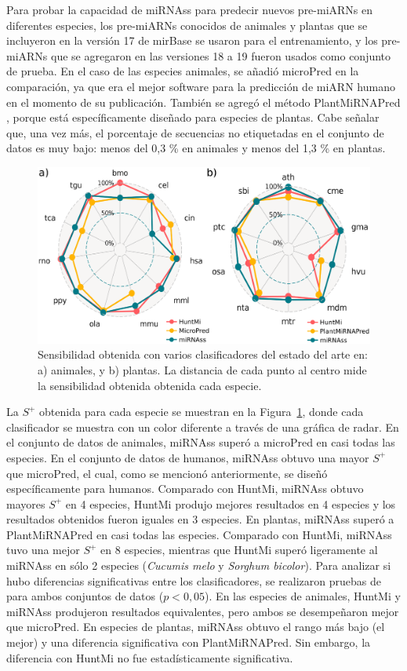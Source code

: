 Para probar la capacidad de miRNAss para predecir nuevos pre-miARNs en diferentes especies, los pre-miARNs conocidos de animales y plantas que se incluyeron en
la versión 17 de mirBase se usaron para el entrenamiento, y los pre-miARNs que se agregaron en las versiones 18 a 19 fueron usados como conjunto de prueba. En
el caso de las especies animales, se añadió microPred \citep{batuwita2009micropred} en la comparación, ya que era el mejor software para la predicción de miARN
humano en el momento de su publicación. También se agregó el método PlantMiRNAPred \citep{xuan2011plantmirnapred}, porque está específicamente diseñado para
especies de plantas. Cabe señalar que, una vez más, el porcentaje de secuencias no etiquetadas en el conjunto de datos es muy bajo: menos del 0,3 \% en animales
y menos del 1,3 \% en plantas.
\begin{figure}[t]
	\centering
	\includegraphics[width=0.6\linewidth]{fig/delta_mirbase_radar.eps}
	\caption[Sensibilidad en animales y plantas]{Sensibilidad obtenida con varios clasificadores del estado del arte en: a) animales, y b) plantas.
		La distancia de cada punto al centro mide la sensibilidad obtenida obtenida cada especie.}
	\label{fig:deltaRadar}
\end{figure}
La $S^{+}$ obtenida para cada especie se muestran en la Figura~\ref{fig:deltaRadar}, donde cada clasificador se muestra con un color diferente a través de una
gráfica de radar. En el conjunto de datos de animales, miRNAss superó a microPred en casi todas las especies. En el conjunto de datos de humanos, miRNAss obtuvo
una mayor $S^{+}$ que microPred, el cual, como se mencionó anteriormente, se diseñó específicamente para humanos. Comparado con HuntMi, miRNAss obtuvo mayores
$S^{+}$ en 4 especies, HuntMi produjo mejores resultados en 4 especies y los resultados obtenidos fueron iguales en 3 especies. En plantas, miRNAss superó a
PlantMiRNAPred en casi todas las especies. Comparado con HuntMi, miRNAss tuvo una mejor $S^{+}$ en 8 especies, mientras que HuntMi superó ligeramente al miRNAss
en sólo 2 especies (\textit{Cucumis melo} y \textit{Sorghum bicolor}).
Para analizar si hubo diferencias significativas entre los clasificadores, se realizaron pruebas de \cite{nemenyi1962distribution} para ambos
conjuntos de datos ($ p<0,05 $). En las especies de animales, HuntMi y miRNAss produjeron resultados equivalentes, pero ambos se desempeñaron mejor que
microPred. En especies de plantas, miRNAss obtuvo el rango más bajo (el mejor) y una diferencia significativa con PlantMiRNAPred. Sin embargo, la diferencia
con HuntMi no fue estadísticamente significativa.

